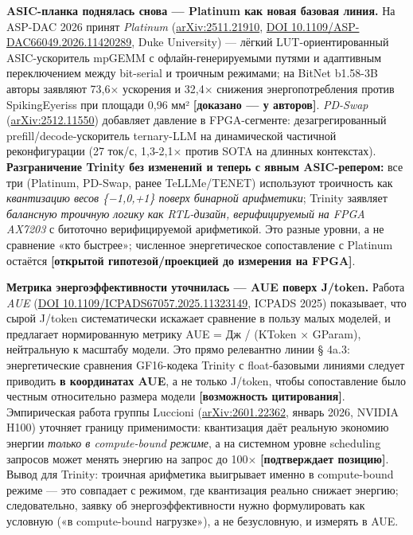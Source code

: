 \documentclass[
  russian,
]{article}
\begin{document}
\textbf{ASIC-планка поднялась снова --- Platinum как новая базовая
линия.} На ASP-DAC 2026 принят \emph{Platinum}
(\href{https://arxiv.org/abs/2511.21910}{arXiv:2511.21910},
\href{https://doi.org/10.1109/ASP-DAC66049.2026.11420289}{DOI
10.1109/ASP-DAC66049.2026.11420289}, Duke University) --- лёгкий
LUT-ориентированный ASIC-ускоритель mpGEMM с офлайн-генерируемыми путями
и адаптивным переключением между bit-serial и троичным режимами; на
BitNet b1.58-3B авторы заявляют 73,6× ускорения и 32,4× снижения
энергопотребления против SpikingEyeriss при площади 0,96 мм²
\textbf{{[}доказано --- у авторов{]}}. \emph{PD-Swap}
(\href{https://arxiv.org/abs/2512.11550}{arXiv:2512.11550}) добавляет
давление в FPGA-сегменте: дезагрегированный prefill/decode-ускоритель
ternary-LLM на динамической частичной реконфигурации (27 ток/с, 1,3-2,1×
против SOTA на длинных контекстах). \textbf{Разграничение Trinity без
изменений и теперь с явным ASIC-репером:} все три (Platinum, PD-Swap,
ранее TeLLMe/TENET) используют троичность как \emph{квантизацию весов
\{−1,0,+1\} поверх бинарной арифметики}; Trinity заявляет
\emph{балансную троичную логику как RTL-дизайн, верифицируемый на FPGA AX7203} с битоточно
верифицируемой арифметикой. Это разные уровни, а не сравнение «кто
быстрее»; численное энергетическое сопоставление с Platinum остаётся
\textbf{{[}открытой гипотезой/проекцией до измерения на FPGA{]}}.

\textbf{Метрика энергоэффективности уточнилась --- AUE поверх J/token.}
Работа \emph{AUE}
(\href{https://doi.org/10.1109/ICPADS67057.2025.11323149}{DOI
10.1109/ICPADS67057.2025.11323149}, ICPADS 2025) показывает, что сырой
J/token систематически искажает сравнение в пользу малых моделей, и
предлагает нормированную метрику AUE = Дж / (KToken × GParam),
нейтральную к масштабу модели. Это прямо релевантно линии § 4a.3:
энергетические сравнения GF16-кодека Trinity с float-базовыми линиями
следует приводить \textbf{в координатах AUE}, а не только J/token, чтобы
сопоставление было честным относительно размера модели
\textbf{{[}возможность цитирования{]}}. Эмпирическая работа группы
Luccioni (\href{https://arxiv.org/abs/2601.22362}{arXiv:2601.22362},
январь 2026, NVIDIA H100) уточняет границу применимости: квантизация
даёт реальную экономию энергии \emph{только в compute-bound режиме}, а
на системном уровне scheduling запросов может менять энергию на запрос
до 100× \textbf{{[}подтверждает позицию{]}}. Вывод для Trinity: троичная
арифметика выигрывает именно в compute-bound режиме --- это совпадает с
режимом, где квантизация реально снижает энергию; следовательно, заявку
об энергоэффективности нужно формулировать как условную («в
compute-bound нагрузке»), а не безусловную, и измерять в AUE.
\end{document}
